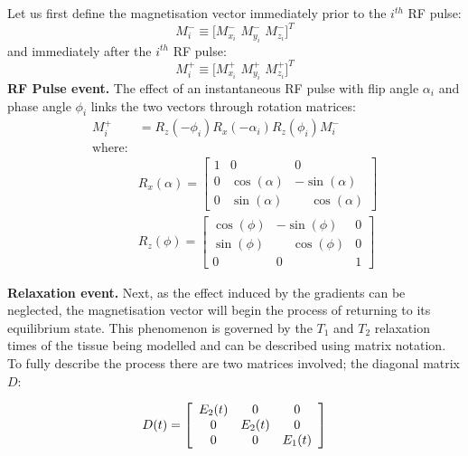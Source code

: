 Let us first define the magnetisation vector immediately prior to the $i^{th}$ RF pulse:
\begin{equation}
    M^{-}_i \equiv \big[ M^-_{x_i} \, \,  M^-_{y_i} \, \, M^-_{z_i} \big]^T
\end{equation}
and immediately after the $i^{th}$ RF pulse:
\begin{equation}
    M^{+}_i \equiv \big[ M^+_{x_i} \, \,  M^+_{y_i} \, \, M^+_{z_i} \big]^T
\end{equation}
\textbf{RF Pulse event.} The effect of an instantaneous RF pulse with flip angle $\alpha_i$ and phase angle $\phi_i$ links the two vectors through rotation matrices:
\begin{equation}
    \begin{split}
        M^{+}_i & = R_{z}(-\phi_i) R_{x}(-\alpha_i) R_{z}(\phi_i) M^{-}_i  \\
        \text{where:}         & \\
        & R_x(\alpha) = 
            \begin{bmatrix}
                1 &       0     &       0      \\
                0 & \cos(\alpha) & -\sin(\alpha) \\
                0 & \sin(\alpha) & \phantom{-}\cos(\alpha)
            \end{bmatrix} \\
        & R_z(\phi) = 
            \begin{bmatrix}
    	        \cos(\phi) & -\sin(\phi) & 0 \\
                \sin(\phi) & \phantom{-}\cos(\phi) & 0 \\
                    0   &      0     & 1
            \end{bmatrix}
    \end{split}
\end{equation}

\textbf{Relaxation event.} Next, as the effect induced by the gradients can be neglected, the magnetisation vector will begin the process of returning to its equilibrium state.
This phenomenon is governed by the $T_1$ and $T_2$ relaxation times of the tissue being modelled and can be described using matrix notation.
To fully describe the process there are two matrices involved; the diagonal matrix $D$:

\begin{equation}
    D ( t ) = \left[
    \begin{array}{c c c}
          E_2(t) &     0      &     0 \\
           0      & E_2(t) &     0 \\
           0      &     0      & E_1(t)
    \end{array}
    \right]
\end{equation}

